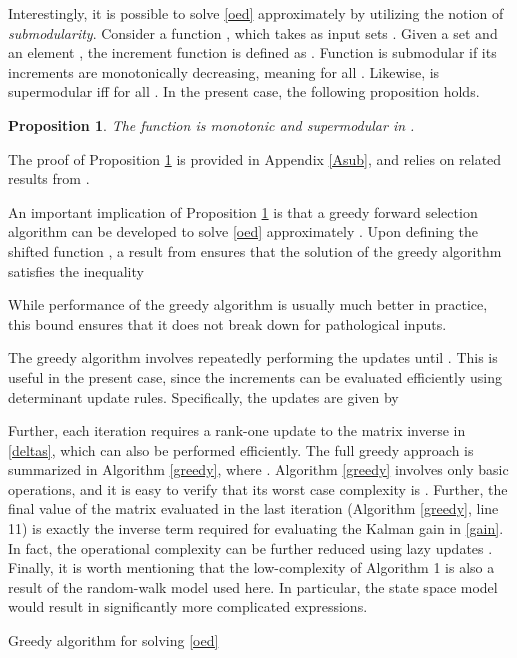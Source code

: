 \documentclass[draftcls,onecolumn,12pt]{IEEEtran}
\theoremstyle{plain}\newtheorem{thm}{Theorem}
\newtheorem{prop}{Proposition}
\theoremstyle{definition}
\theoremstyle{remark}
\begin{document}
Interestingly, it is possible to solve \eqref{oed} approximately by utilizing the notion of \emph{submodularity}. 
Consider a function , which takes as input sets . 
Given a set  and an element , the increment function is defined as .
Function  is submodular if its increments are monotonically decreasing, meaning  for all .
Likewise,  is supermodular iff  for all .
In the present case, the following proposition holds.
\begin{prop}\label{propsub}
The function  is monotonic and supermodular in .
\end{prop}
The proof of Proposition \ref{propsub} is provided in Appendix \ref{Asub}, and relies on related results from \cite{bach}. 

An important implication of Proposition \ref{propsub} is that a greedy forward selection algorithm can be developed to solve \eqref{oed} approximately \cite{nemh}.
Upon defining the shifted function , a result from \cite{nemh} ensures that the solution of the greedy algorithm  satisfies the inequality

While performance of the greedy algorithm is usually much better in practice, this bound ensures that it does not break down for pathological inputs.


The greedy algorithm involves repeatedly performing the updates  until . This is useful in the present case, since the increments can be evaluated efficiently using determinant update rules. Specifically, the updates are given by

Further, each iteration requires a rank-one update to the matrix inverse in \eqref{deltas}, which can also be performed efficiently. 
The full greedy approach is summarized in Algorithm \ref{greedy}, where . 
Algorithm \ref{greedy} involves only basic operations, and it is easy to verify that its worst case complexity is .
Further, the final value of the matrix  evaluated in the last iteration (Algorithm \ref{greedy}, line 11) is exactly the inverse term required for evaluating the Kalman gain in \eqref{gain}.
In fact, the operational complexity can be further reduced using lazy updates \cite{minoux}. 
{ Finally, it is worth mentioning that the low-complexity of Algorithm 1 is also a result of the random-walk model used here. In particular, the state space model  would result in significantly more complicated expressions. }


\begin{algorithm}
\caption{Greedy algorithm for solving \eqref{oed}}\label{greedy}
\end{algorithm}
\end{document}
